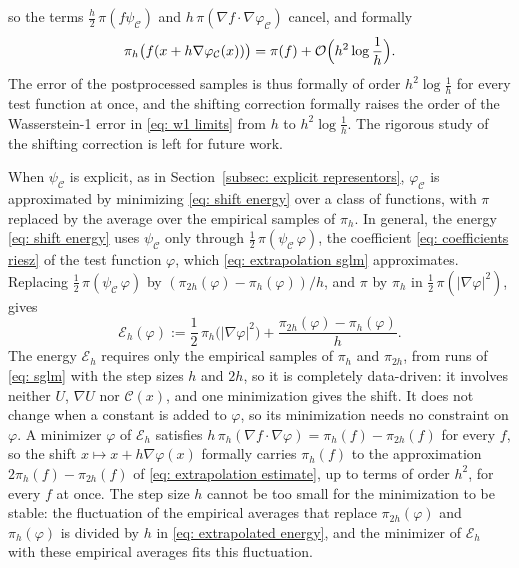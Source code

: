 \documentclass{article}
\numberwithin{equation}{section}
\begin{document}
so the terms $\frac h2\, \pi(f \psi_{\mathcal C})$ and $h\, \pi(\nabla f \cdot \nabla \varphi_{\mathcal C})$ cancel, and formally
\begin{equation*}
    \pi_h\bigl( f(x + h \nabla \varphi_{\mathcal C}(x)) \bigr) = \pi(f) + \mathcal O\Bigl( h^2 \log\frac1h \Bigr) .
\end{equation*}
The error of the postprocessed samples is thus formally of order $h^2 \log\frac1h$ for every test function at once, and the shifting correction formally raises the order of the Wasserstein-1 error in \eqref{eq: w1 limits} from $h$ to $h^2 \log\frac1h$. The rigorous study of the shifting correction is left for future work.

When $\psi_{\mathcal C}$ is explicit, as in Section~\ref{subsec: explicit representors}, $\varphi_{\mathcal C}$ is approximated by minimizing \eqref{eq: shift energy} over a class of functions, with $\pi$ replaced by the average over the empirical samples of $\pi_h$. In general, the energy \eqref{eq: shift energy} uses $\psi_{\mathcal C}$ only through $\frac12\, \pi(\psi_{\mathcal C}\, \varphi)$, the coefficient \eqref{eq: coefficients riesz} of the test function $\varphi$, which \eqref{eq: extrapolation sglm} approximates. Replacing $\frac12\, \pi(\psi_{\mathcal C}\, \varphi)$ by $(\pi_{2h}(\varphi) - \pi_h(\varphi))/h$, and $\pi$ by $\pi_h$ in $\frac12\, \pi(|\nabla \varphi|^2)$, gives
\begin{equation}
    \mathcal E_h(\varphi) := \frac12\, \pi_h\bigl( |\nabla \varphi|^2 \bigr) + \frac{\pi_{2h}(\varphi) - \pi_h(\varphi)}{h} .
    \label{eq: extrapolated energy}
\end{equation}
The energy $\mathcal E_h$ requires only the empirical samples of $\pi_h$ and $\pi_{2h}$, from runs of \eqref{eq: sglm} with the step sizes $h$ and $2h$, so it is completely data-driven: it involves neither $U$, $\nabla U$ nor $\mathcal C(x)$, and one minimization gives the shift. It does not change when a constant is added to $\varphi$, so its minimization needs no constraint on $\varphi$. A minimizer $\varphi$ of $\mathcal E_h$ satisfies $h\, \pi_h(\nabla f \cdot \nabla \varphi) = \pi_h(f) - \pi_{2h}(f)$ for every $f$, so the shift $x \mapsto x + h \nabla \varphi(x)$ formally carries $\pi_h(f)$ to the approximation $2\pi_h(f) - \pi_{2h}(f)$ of \eqref{eq: extrapolation estimate}, up to terms of order $h^2$, for every $f$ at once. The step size $h$ cannot be too small for the minimization to be stable: the fluctuation of the empirical averages that replace $\pi_{2h}(\varphi)$ and $\pi_h(\varphi)$ is divided by $h$ in \eqref{eq: extrapolated energy}, and the minimizer of $\mathcal E_h$ with these empirical averages fits this fluctuation.
\end{document}
